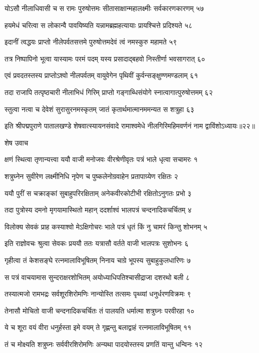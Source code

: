 योऽसौ नीलाधिवासी च स रामः पुरुषोत्तमः
सीतासाक्षान्महालक्ष्मीः सर्वकारणकारणम् ५७

हयमेधं चरित्वा स लोकान्वै पावयिष्यति
यन्नामब्रह्महत्यायाः प्रायश्चित्ते प्रदिश्यते ५८

इदानीं त्वद्धयः प्राप्तो नीलेपर्वतसत्तमे
पुरुषोत्तमदेवं त्वं नमस्कुरु महामते ५९

तत्र निष्पापिनो भूत्वा यास्यामः परमं पदम्
यस्य प्रसादाद्बहवो निस्तीर्णा भवसागरात् ६०

एवं प्रवदतस्तस्य प्राप्तोऽश्वो नीलपर्वतम्
वायुवेगेन पृथिवीं कुर्वन्सङ्क्षुण्णमण्डलाम् ६१

तदा राजापि तत्पृष्ठचारी नीलाभिधं गिरिम्
प्राप्तो गङ्गाब्धिसंयोगे स्नात्वागात्पुरुषोत्तमम् ६२

स्तुत्वा नत्वा च देवेशं सुरासुरनमस्कृतम्
जातं कृतार्थमात्मानममन्यत स शत्रुहा ६३

इति श्रीपद्मपुराणे पातालखण्डे शेषवात्स्यायनसंवादे रामाश्वमेधे नीलगिरिमहिमवर्णनं नाम द्वाविंशोऽध्यायः॥२२॥


शेष उवाच

क्षणं स्थित्वा तृणान्यत्त्वा ययौ वाजी मनोजवः
वीरश्रेणीवृतः पत्रं भाले धृत्वा सचामरः १

शत्रुघ्नेन सुवीरेण लक्ष्मीनिधि नृपेण च
पुष्कलेनोग्रवाहेन प्रतापाग्र्येण रक्षितः २

ययौ पुरीं स चक्राङ्कां सुबाहुपरिरक्षिताम्
अनेकवीरकोटीभी रक्षितोऽनुगतः प्रभो ३

तदा पुत्रोस्य दमनो मृगयामास्थितो महान्
ददर्शाश्वं भालपत्रं चन्दनादिकचर्चितम् ४

विलोक्य सेवकं प्राह कस्याश्वो मेऽक्षिगोचरः
भाले पत्रं धृतं किं नु चामरं किन्तु शोभनम् ५

इति राज्ञोवचः श्रुत्वा सेवकः प्रययौ ततः
यत्रासौ वर्तते वाजी भालपत्रः सुशोभनः ६

गृहीत्वा तं केशसङ्घे रत्नमालाविभूषितम्
निनाय चाग्रे भूपस्य सुबाहुकुलधारिणः ७

स पत्रं वाचयामास सुन्दराक्षरशोभितम्
अयोध्याधिपतिश्चासीद्राजा दशरथो बली ८

तस्यात्मजो रामभद्रः सर्वशूरशिरोमणिः
नान्योस्ति तत्समः पृथ्व्यां धनुर्धरणविक्रमः ९

तेनासौ मोचितो वाजी चन्दनादिकचर्चितः
तं पालयति धर्मात्मा शत्रुघ्नः परवीरहा १०

ये च शूरा वयं वीरा धनुर्हस्ता इमे वयम्
ते गृह्णन्तु बलाद्वाहं रत्नमालाविभूषितम् ११

तं च मोक्ष्यति शत्रुघ्नः सर्ववीरशिरोमणिः
अन्यथा पादयोस्तस्य प्रणतिं यान्तु धन्विनः १२

